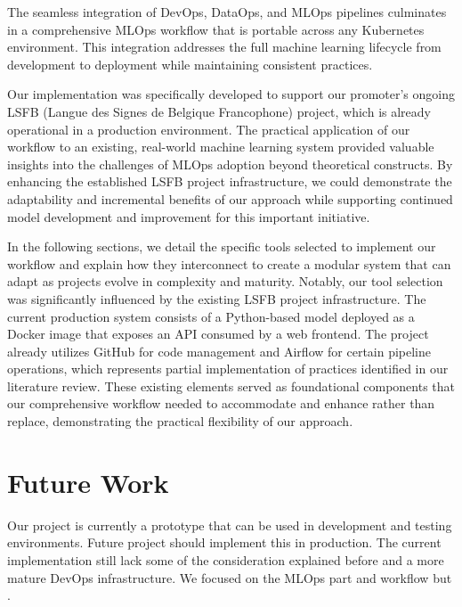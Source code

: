 The seamless integration of DevOps, DataOps, and MLOps pipelines culminates in a comprehensive MLOps workflow that is portable across any Kubernetes environment.
This integration addresses the full machine learning lifecycle from development to deployment while maintaining consistent practices. %

Our implementation was specifically developed to support our promoter's ongoing LSFB (Langue des Signes de Belgique Francophone) project, which is already operational in a production environment.
The practical application of our workflow to an existing, real-world machine learning system provided valuable insights into the challenges of MLOps adoption beyond theoretical constructs.
By enhancing the established LSFB project infrastructure, we could demonstrate the adaptability and incremental benefits of our approach while supporting continued model development and improvement for this important initiative.

In the following sections, we detail the specific tools selected to implement our workflow and explain how they interconnect to create a modular system that can adapt as projects evolve in complexity and maturity.
Notably, our tool selection was significantly influenced by the existing LSFB project infrastructure.
The current production system consists of a Python-based model deployed as a Docker image that exposes an API consumed by a web frontend.
The project already utilizes GitHub for code management and Airflow for certain pipeline operations, which represents partial implementation of practices identified in our literature review.
These existing elements served as foundational components that our comprehensive workflow needed to accommodate and enhance rather than replace, demonstrating the practical flexibility of our approach.



% 




\section{Future Work}\label{sec:future-work}
Our project is currently a prototype that can be used in development and testing environments.
Future project should implement this in production.
The current implementation still lack some of the consideration explained before and a more mature DevOps infrastructure.
We focused on the MLOps part and workflow but .

